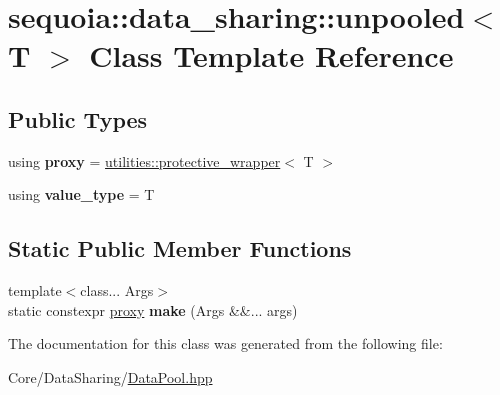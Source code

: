 \hypertarget{classsequoia_1_1data__sharing_1_1unpooled}{}\section{sequoia\+::data\+\_\+sharing\+::unpooled$<$ T $>$ Class Template Reference}
\label{classsequoia_1_1data__sharing_1_1unpooled}
\subsection*{Public Types}
\begin{DoxyCompactItemize}
\item 
\mbox{\label{classsequoia_1_1data__sharing_1_1unpooled_ab6c498a0ad65656ba8a3f19f9ee5c911}} 
using {\bfseries proxy} = \mbox{\hyperlink{classsequoia_1_1utilities_1_1protective__wrapper}{utilities\+::protective\+\_\+wrapper}}$<$ T $>$
\item 
\mbox{\label{classsequoia_1_1data__sharing_1_1unpooled_ae8387fdcfa792598ef8d4c519c231924}} 
using {\bfseries value\+\_\+type} = T
\end{DoxyCompactItemize}
\subsection*{Static Public Member Functions}
\begin{DoxyCompactItemize}
\item 
\mbox{\label{classsequoia_1_1data__sharing_1_1unpooled_aca796a7276072e8ff086c1107108eb9b}} 
{\footnotesize template$<$class... Args$>$ }\\static constexpr \mbox{\hyperlink{classsequoia_1_1utilities_1_1protective__wrapper}{proxy}} {\bfseries make} (Args \&\&... args)
\end{DoxyCompactItemize}


The documentation for this class was generated from the following file\+:\begin{DoxyCompactItemize}
\item 
Core/\+Data\+Sharing/\mbox{\hyperlink{_data_pool_8hpp}{Data\+Pool.\+hpp}}\end{DoxyCompactItemize}
